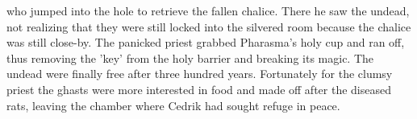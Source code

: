who jumped into the hole to retrieve the fallen chalice. There he saw the undead, not realizing that they were still locked into the silvered room because the chalice was still close-by. The panicked priest grabbed Pharasma's holy cup and ran off, thus removing the 'key' from the holy barrier and breaking its magic. The undead were finally free after three hundred years. Fortunately for the clumsy priest the ghasts were more interested in food and made off after the diseased rats, leaving the chamber where Cedrik had sought refuge in peace.\\


